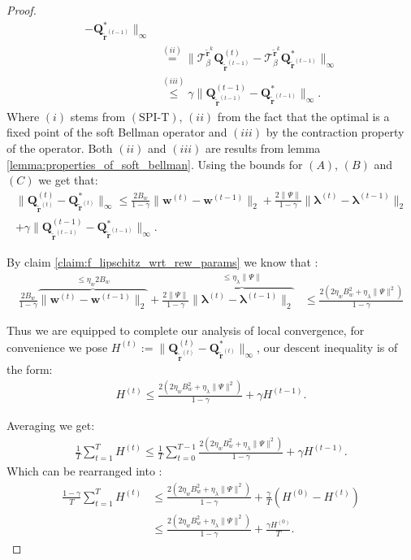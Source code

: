\begin{proof}
\begin{align*}
    - \bm{Q}^*_{\tilde{\bm{r}}^{(t-1)}} 
    \|_\infty  \\
    & \stackrel{(ii)}{=} 
    \|  
    \mathcal{T}^{\tilde{\bm{r}}^{k}}_\beta 
    \bm{Q}^{(t)}_{\tilde{\bm{r}}^{(t-1)}}  
    - \mathcal{T}^{\tilde{\bm{r}}^{k}}_\beta
    \bm{Q}^*_{\tilde{\bm{r}}^{(t-1)}} 
    \|_\infty  \\
    & \stackrel{(iii)}{\leq} 
    \gamma
    \|  
    \bm{Q}^{(t-1)}_{\tilde{\bm{r}}^{(t-1)}}  
    -  \bm{Q}^*_{\tilde{\bm{r}}^{(t-1)}} 
    \|_\infty.
\end{align*}
Where $(i)$ stems from $(\text{SPI-T})$, $(ii)$ from the fact that the optimal is a fixed point of the soft Bellman operator and $(iii)$ by the contraction property of the operator. Both $(ii)$ and $(iii)$ are results from lemma \ref{lemma:properties_of_soft_bellman}.
Using the bounds for $(A)$, $(B)$ and $(C)$ we get that: 
\begin{align*}
    \|\bm{Q}^{(t)}_{\tilde{\bm{r}}^{(t)}}- \bm{Q}^*_{\tilde{\bm{r}}^{(t)}} \|_\infty 
    \leq
    \frac{2B_w}{1 - \gamma} \| \bm{w}^{(t)} - \bm{w}^{(t-1)} \|_2 +
    \frac{2\|\Psi\|}{1 - \gamma} \| \bm{\lambda}^{(t)} - \bm{\lambda}^{(t-1)} \|_2 
    \\+ \gamma
    \|  
    \bm{Q}^{(t-1)}_{\tilde{\bm{r}}^{(t-1)}}  
    -  \bm{Q}^*_{\tilde{\bm{r}}^{(t-1)}} 
    \|_\infty.
\end{align*}

By claim \ref{claim:f_lipschitz_wrt_rew_params} we know that :
\begin{align*}
    \frac{2B_w}{1 - \gamma} 
    \overbrace{\| \bm{w}^{(t)} - \bm{w}^{(t-1)} \|_2}^{
        \leq\eta_w 2B_w
    }
    +
    \frac{2\|\Psi\|}{1 - \gamma}
    \overbrace{\| \bm{\lambda}^{(t)} - \bm{\lambda}^{(t-1)} \|_2}^{
        \leq \eta_\lambda\|\Psi\|
    }
    &\leq 
    \frac{2(2\eta_w B_w^2+\eta_\lambda\|\Psi\|^2)}{1 - \gamma} 
\end{align*}

Thus we are equipped to complete our analysis of local convergence, for convenience we pose $H^{(t)} := \|\bm{Q}^{(t)}_{\tilde{\bm{r}}^{(t)}}- \bm{Q}^*_{\tilde{\bm{r}}^{(t)}} \|_\infty$, our descent inequality is of the form:
\begin{align*}
    H^{(t)} \leq\frac{2(2\eta_w B_w^2+\eta_\lambda\|\Psi\|^2)}{1 - \gamma}  + \gamma H^{(t-1)}.
\end{align*}

Averaging we get:
\begin{align*}
   \frac{1}{T} \sum^{T}_{t=1} H^{(t)} \leq
   \frac{1}{T} \sum^{T-1}_{t=0} \frac{2(2\eta_w B_w^2+\eta_\lambda\|\Psi\|^2)}{1 - \gamma} + \gamma H^{(t-1)}.
\end{align*}
Which can be rearranged into :
\begin{align*}
   \frac{1-\gamma}{T} \sum^{T}_{t=1} H^{(t)} 
   &\leq
   \frac{2(2\eta_w B_w^2+\eta_\lambda\|\Psi\|^2)}{1 - \gamma}  +
   \frac{\gamma}{T} (H^{(0)}-H^{(t)})\\
   &\leq
   \frac{2(2\eta_w B_w^2+\eta_\lambda\|\Psi\|^2)}{1 - \gamma}  +
   \frac{\gamma H^{(0)}}{T}.
\end{align*}


\end{proof}
